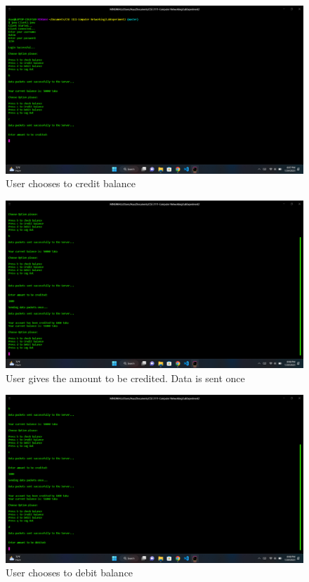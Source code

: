 \documentclass[11pt]{article}
\begin{document}
\begin{figure}[!h]
\centering
\includegraphics[width=\textwidth]{122.png}
\caption{ User chooses to credit balance}
\end{figure}


\newpage

\begin{figure}[!h]
\centering
\includegraphics[width=\textwidth]{123.png}
\caption{ User gives the amount to be credited. Data is sent once}
\end{figure}


\begin{figure}[!h]
\centering
\includegraphics[width=\textwidth]{124.png}
\caption{User chooses to debit balance}
\end{figure}
\end{document}
